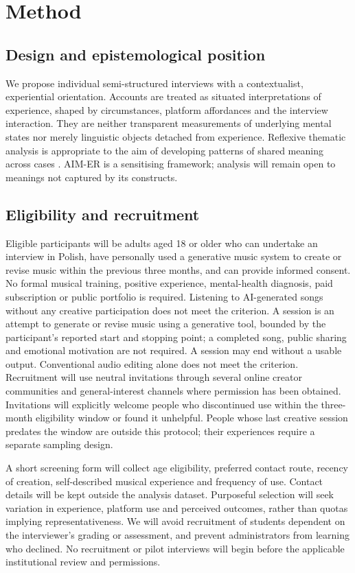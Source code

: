 \section{Method}
\subsection{Design and epistemological position}
We propose individual semi-structured interviews with a contextualist, experiential orientation. Accounts are treated as situated interpretations of experience, shaped by circumstances, platform affordances and the interview interaction. They are neither transparent measurements of underlying mental states nor merely linguistic objects detached from experience. Reflexive thematic analysis is appropriate to the aim of developing patterns of shared meaning across cases \citep{braun2021,byrne2022}. AIM-ER is a sensitising framework; analysis will remain open to meanings not captured by its constructs.

\subsection{Eligibility and recruitment}
Eligible participants will be adults aged 18 or older who can undertake an interview in Polish, have personally used a generative music system to create or revise music within the previous three months, and can provide informed consent. No formal musical training, positive experience, mental-health diagnosis, paid subscription or public portfolio is required. Listening to AI-generated songs without any creative participation does not meet the criterion. A session is an attempt to generate or revise music using a generative tool, bounded by the participant's reported start and stopping point; a completed song, public sharing and emotional motivation are not required. A session may end without a usable output. Conventional audio editing alone does not meet the criterion. Recruitment will use neutral invitations through several online creator communities and general-interest channels where permission has been obtained. Invitations will explicitly welcome people who discontinued use within the three-month eligibility window or found it unhelpful. People whose last creative session predates the window are outside this protocol; their experiences require a separate sampling design.

A short screening form will collect age eligibility, preferred contact route, recency of creation, self-described musical experience and frequency of use. Contact details will be kept outside the analysis dataset. Purposeful selection will seek variation in experience, platform use and perceived outcomes, rather than quotas implying representativeness. We will avoid recruitment of students dependent on the interviewer's grading or assessment, and prevent administrators from learning who declined. No recruitment or pilot interviews will begin before the applicable institutional review and permissions.


